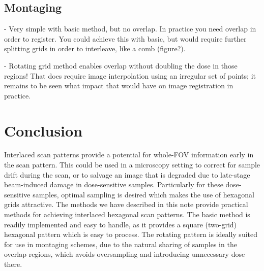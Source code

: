 \documentclass{article}
\begin{document}
\subsection{Montaging}
\label{sec:montaging}

- Very simple with basic method, but no overlap. In practice you need overlap in order to register. You could achieve this with basic, but would require further splitting grids in order to interleave, like a comb (figure?).

- Rotating grid method enables overlap without doubling the dose in those regions! That does require image interpolation using an irregular set of points; it remains to be seen what impact that would have on image registration in practice.

\section{Conclusion}
\label{sec:conclusion}

Interlaced scan patterns provide a potential for whole-FOV information early in the scan pattern.
%
This could be used in a microscopy setting to correct for sample drift during the scan, or to salvage an image that is degraded due to late-stage beam-induced damage in dose-sensitive samples.
%
Particularly for these dose-sensitive samples, optimal sampling is desired which makes the use of hexagonal grids attractive.
%
The methods we have described in this note provide practical methods for achieving interlaced hexagonal scan patterns.
%
The basic method is readily implemented and easy to handle, as it provides a square (two-grid) hexagonal pattern which is easy to process.
%
The rotating pattern is ideally suited for use in montaging schemes, due to the natural sharing of samples in the overlap regions, which avoids oversampling and introducing unnecessary dose there.



\end{document}
